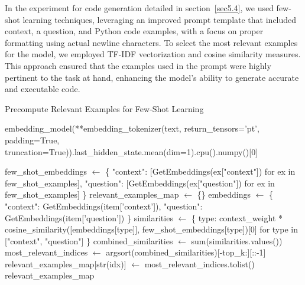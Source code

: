 \documentclass[logo,msc]{infthesis}           %
\begin{document}
In the experiment for code generation detailed in section~\ref{sec5.4}, we used few-shot learning techniques, leveraging an improved prompt template that included context, a question, and Python code examples, with a focus on proper formatting using actual newline characters.
To select the most relevant examples for the model, we employed TF-IDF vectorization and cosine similarity measures. This approach ensured that the examples used in the prompt were highly pertinent to the task at hand, enhancing the model's ability to generate accurate and executable code.


\begin{algorithm}[H]
\caption{Precompute Relevant Examples for Few-Shot Learning}
\label{alg:precomputeExamples}
\begin{algorithmic}[1]
 \State \Return embedding\_model(**embedding\_tokenizer(text, return\_tensors='pt', padding=True, truncation=True)).last\_hidden\_state.mean(dim=1).cpu().numpy()[0]
\EndFunction

    \State few\_shot\_embeddings $\gets$ \{ "context": [GetEmbeddings(ex["context"]) for ex in few\_shot\_examples], "question": [GetEmbeddings(ex["question"]) for ex in few\_shot\_examples] \}
    \State relevant\_examples\_map $\gets$ \{\}
        \State embeddings $\gets$ \{ "context": GetEmbeddings(item['context']), "question": GetEmbeddings(item['question']) \}
        \State similarities $\gets$ \{ type: context\_weight * cosine\_similarity([embeddings[type]], few\_shot\_embeddings[type])[0] for type in ["context", "question"] \}
        \State combined\_similarities $\gets$ sum(similarities.values())
        \State most\_relevant\_indices $\gets$ argsort(combined\_similarities)[-top\_k:][::-1]
        \State relevant\_examples\_map[str(idx)] $\gets$ most\_relevant\_indices.tolist()
    \EndFor
    \State \Return relevant\_examples\_map
\EndFunction



\end{algorithmic}
\end{algorithm}
\end{document}
